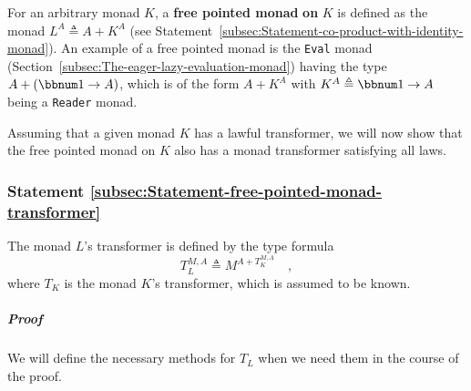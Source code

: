 For an arbitrary monad $K$, a \textbf{free pointed monad} \textbf{on}
$K$ is defined as the monad $L^{A}\triangleq A+K^{A}$ (see Statement~\ref{subsec:Statement-co-product-with-identity-monad}).
An example of a free pointed monad is the \lstinline!Eval! monad
(Section~\ref{subsec:The-eager-lazy-evaluation-monad}) having the
type $A+(\bbnum 1\rightarrow A)$, which is of the form $A+K^{A}$
with $K^{A}\triangleq\bbnum 1\rightarrow A$ being a \lstinline!Reader!
monad. 

Assuming that a given monad $K$ has a lawful transformer, we will
now show that the free pointed monad on $K$ also has a monad transformer
satisfying all laws.

\subsubsection{Statement \label{subsec:Statement-free-pointed-monad-transformer}\ref{subsec:Statement-free-pointed-monad-transformer}}

The monad $L$\textsf{'}s transformer is defined by the type formula
\[
T_{L}^{M,A}\triangleq M^{A+T_{K}^{M,A}}\quad,
\]
where $T_{K}$ is the monad $K$\textsf{'}s transformer, which is assumed to
be known. 

\subparagraph{Proof}

We will define the necessary methods for $T_{L}$ when we need them
in the course of the proof.

